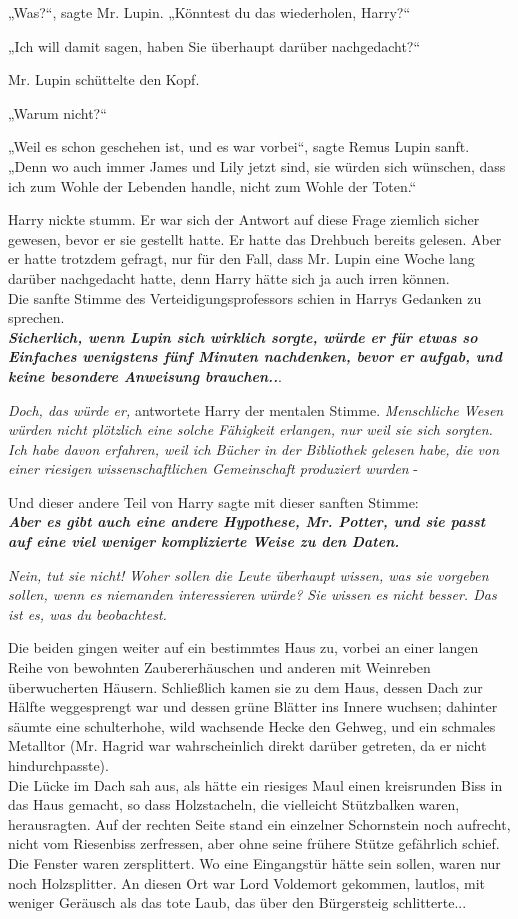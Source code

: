 {„Was?“, sagte Mr. Lupin. „Könntest du das wiederholen, Harry?“

„Ich will damit sagen, haben Sie überhaupt darüber nachgedacht?“

Mr. Lupin schüttelte den Kopf.

„Warum nicht?“

„Weil es schon geschehen ist, und es war vorbei“, sagte Remus Lupin sanft. „Denn wo auch immer James und Lily jetzt sind, sie würden sich wünschen, dass ich zum Wohle der Lebenden handle, nicht zum Wohle der Toten.“

Harry nickte stumm. Er war sich der Antwort auf diese Frage ziemlich sicher gewesen, bevor er sie gestellt hatte. Er hatte das Drehbuch bereits gelesen. Aber er hatte trotzdem gefragt, nur für den Fall, dass Mr. Lupin eine Woche lang darüber nachgedacht hatte, denn Harry hätte sich ja auch irren können.\\ Die sanfte Stimme des Verteidigungsprofessors schien in Harrys Gedanken zu sprechen.\\ \textbf{\emph{Sicherlich, wenn Lupin sich wirklich sorgte, würde er für etwas so Einfaches wenigstens fünf Minuten nachdenken, bevor er aufgab, und keine besondere Anweisung brauchen..}}.

\emph{Doch, das würde er,} antwortete Harry der mentalen Stimme. \emph{Menschliche Wesen würden nicht plötzlich eine solche Fähigkeit erlangen, nur weil sie sich sorgten. Ich habe davon erfahren, weil ich Bücher in der Bibliothek gelesen habe, die von einer riesigen wissenschaftlichen Gemeinschaft produziert wurden} -

Und dieser andere Teil von Harry sagte mit dieser sanften Stimme:\\ \textbf{\emph{Aber es gibt auch eine andere Hypothese, Mr. Potter, und sie passt auf eine viel weniger komplizierte Weise zu den Daten.}}

\emph{Nein, tut sie nicht! Woher sollen die Leute überhaupt wissen, was sie vorgeben sollen, wenn es niemanden interessieren würde? Sie wissen es nicht besser. Das ist es, was du beobachtest.}

Die beiden gingen weiter auf ein bestimmtes Haus zu, vorbei an einer langen Reihe von bewohnten Zaubererhäuschen und anderen mit Weinreben überwucherten Häusern. Schließlich kamen sie zu dem Haus, dessen Dach zur Hälfte weggesprengt war und dessen grüne Blätter ins Innere wuchsen; dahinter säumte eine schulterhohe, wild wachsende Hecke den Gehweg, und ein schmales Metalltor (Mr. Hagrid war wahrscheinlich direkt darüber getreten, da er nicht hindurchpasste).\\ Die Lücke im Dach sah aus, als hätte ein riesiges Maul einen kreisrunden Biss in das Haus gemacht, so dass Holzstacheln, die vielleicht Stützbalken waren, herausragten. Auf der rechten Seite stand ein einzelner Schornstein noch aufrecht, nicht vom Riesenbiss zerfressen, aber ohne seine frühere Stütze gefährlich schief. Die Fenster waren zersplittert. Wo eine Eingangstür hätte sein sollen, waren nur noch Holzsplitter. An diesen Ort war Lord Voldemort gekommen, lautlos, mit weniger Geräusch als das tote Laub, das über den Bürgersteig schlitterte...

}
